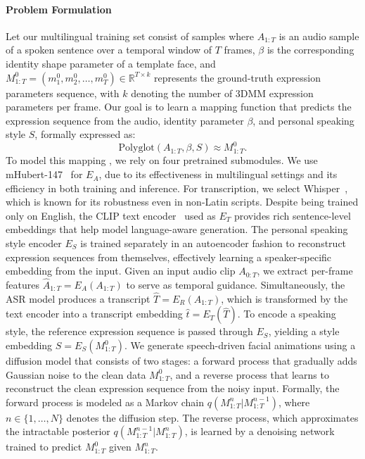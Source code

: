 \documentclass[a4paper, 10pt, conference]{ieeeconf}      %
\begin{document}
\paragraph{Problem Formulation}  
Let our multilingual training set consist of samples where \( A_{1:T} \) is an audio sample of a spoken sentence over a temporal window of \( T \) frames, \( \beta \) is the corresponding identity shape parameter of a template face, and \( M_{1:T}^{0} = (m_1^0, m_2^0, \dots, m_T^0) \in \mathbb{R}^{T \times k} \) represents the ground-truth expression parameters sequence, with \( k \) denoting the number of 3DMM expression parameters per frame. Our goal is to learn a mapping function that predicts the expression sequence from the audio, identity parameter \( \beta \), and personal speaking style \( S \), formally expressed as:
\begin{equation}
\text{Polyglot}(A_{1:T}, \beta, S) \approx M_{1:T}^{0}.
\end{equation}
To model this mapping , we rely on four pretrained submodules. We use mHubert-147~\cite{boito2024mhubert} for \( E_A \), due to its effectiveness in multilingual settings and its efficiency in both training and inference. For transcription, we select Whisper~\cite{radford2021learningtransferablevisualmodels}, which is known for its robustness even in non-Latin scripts. Despite being trained only on English, the CLIP text encoder~\cite{clip} used as \( E_T \) provides rich sentence-level embeddings that help model language-aware generation. The personal speaking style encoder \( E_S \) is trained separately in an autoencoder fashion to reconstruct expression sequences from themselves, effectively learning a speaker-specific embedding from the input.
Given an input audio clip \( A_{0:T} \), we extract per-frame features \( \hat{A}_{1:T} = E_A(A_{1:T}) \) to serve as temporal guidance. Simultaneously, the ASR model produces a transcript \( \hat{T} = E_R(A_{1:T}) \), which is transformed by the text encoder into a transcript embedding \( \hat{t} = E_T(\hat{T}) \). To encode a speaking style, the reference expression sequence is passed through \( E_S \), yielding a style embedding \( S = E_S(M_{1:T}^{0}) \).
We generate speech-driven facial animations using a diffusion model that consists of two stages: a forward process that gradually adds Gaussian noise to the clean data \( M_{1:T}^{0} \), and a reverse process that learns to reconstruct the clean expression sequence from the noisy input. Formally, the forward process is modeled as a Markov chain \( q(M_{1:T}^{n} | M_{1:T}^{n-1}) \), where \( n \in \{1, \dots, N\} \) denotes the diffusion step. The reverse process, which approximates the intractable posterior \( q(M_{1:T}^{n-1} | M_{1:T}^{n}) \), is learned by a denoising network trained to predict \( M_{1:T}^{0} \) given \( M_{1:T}^{n} \).
\end{document}
